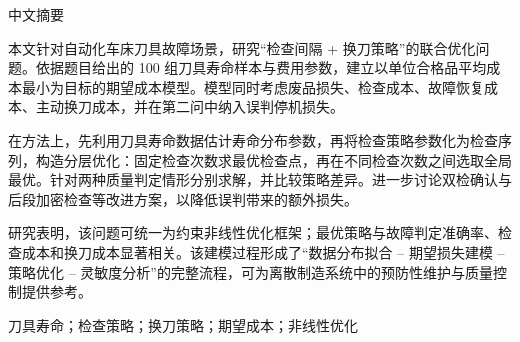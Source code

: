 \thispagestyle{plain}
{}
\centerline{\heiti 中文摘要}

\linespread{1.4}\bigskip

本文针对自动化车床刀具故障场景，研究“检查间隔 + 换刀策略”的联合优化问题。依据题目给出的 100 组刀具寿命样本与费用参数，建立以单位合格品平均成本最小为目标的期望成本模型。模型同时考虑废品损失、检查成本、故障恢复成本、主动换刀成本，并在第二问中纳入误判停机损失。

在方法上，先利用刀具寿命数据估计寿命分布参数，再将检查策略参数化为检查序列，构造分层优化：固定检查次数求最优检查点，再在不同检查次数之间选取全局最优。针对两种质量判定情形分别求解，并比较策略差异。进一步讨论双检确认与后段加密检查等改进方案，以降低误判带来的额外损失。

研究表明，该问题可统一为约束非线性优化框架；最优策略与故障判定准确率、检查成本和换刀成本显著相关。该建模过程形成了“数据分布拟合 -- 期望损失建模 -- 策略优化 -- 灵敏度分析”的完整流程，可为离散制造系统中的预防性维护与质量控制提供参考。

\bigskip
{}
刀具寿命；检查策略；换刀策略；期望成本；非线性优化
